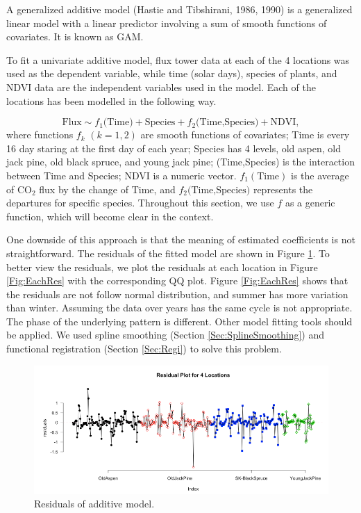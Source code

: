 \documentclass{article}\usepackage[]{graphicx}\usepackage[]{color}
\begin{document}
A generalized additive model (Hastie and Tibshirani, 1986, 1990) is a generalized linear model with a linear predictor involving a sum of smooth functions of covariates. It is known as GAM. 

To fit a univariate additive model, flux tower data at each of the 4 locations was used as the dependent variable,  while time (solar days), species of plants, and NDVI data are the independent variables used in the model.  Each of the locations has been modelled in the following way.


\begin{equation}
\textrm{Flux} \sim f_1\textrm{(Time)} + \textrm{Species}  + f_2\textrm{(Time,Species)} + \textrm{NDVI},\label{Eq:AddMod}
\end{equation}
where functions $f_k$  $(k=1,2)$ are smooth functions of covariates; Time is every 16 day staring at the first day of each year; Species has 4 levels, old aspen, old jack pine, old black spruce, and young jack pine; (Time,Species) is the interaction between Time and Species; NDVI is a numeric vector. $f_1(\textrm{Time})$ is the average of CO$_2$ flux by the change of $\textrm{Time}$, and $f_2\textrm{(Time,Species)}$ represents the departures for specific species. Throughout this section, we use $f$ as a generic function, which will become clear in the context.


One downside of this approach is that the meaning of estimated coefficients is not straightforward. The residuals of the fitted model are shown in Figure \ref{Fig:GAM}. To better view the residuals, we plot the residuals at each location in Figure \ref{Fig:EachRes} with the corresponding QQ plot. Figure \ref{Fig:EachRes} shows that the residuals are not follow normal distribution, and summer has more variation than winter. Assuming the data over years has the same cycle is not appropriate. The phase of the underlying pattern is different. Other model fitting tools should be applied.  We used spline smoothing (Section \ref{Sec:SplineSmoothing})  and functional registration (Section \ref{Sec:Regi}) to solve this problem.

\begin{figure}[ht]
\centering
\includegraphics[width=14cm]{res3.png}
\caption{Residuals of additive model.}\label{Fig:GAM}
\end{figure}
\end{document}
